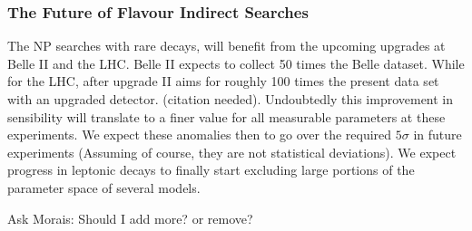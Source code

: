 \subsubsection{The Future of Flavour Indirect Searches}

The NP searches with rare decays, will benefit from the upcoming upgrades at Belle II and the LHC. Belle II expects to collect 50 times the Belle dataset.
%
While for the LHC, after upgrade II aims for roughly 100 times the present data set with an upgraded detector. {\color{blue} (citation needed)}.
%
Undoubtedly this improvement in sensibility will translate to a finer value for all measurable parameters at these experiments. We expect these anomalies then to go over the required $5 \sigma$ in future experiments (Assuming of course, they are not statistical deviations).
%
We expect progress in leptonic decays to finally start excluding large portions of the parameter space of several models. 

{ \color{red} Ask Morais: Should I add more? or remove? }

